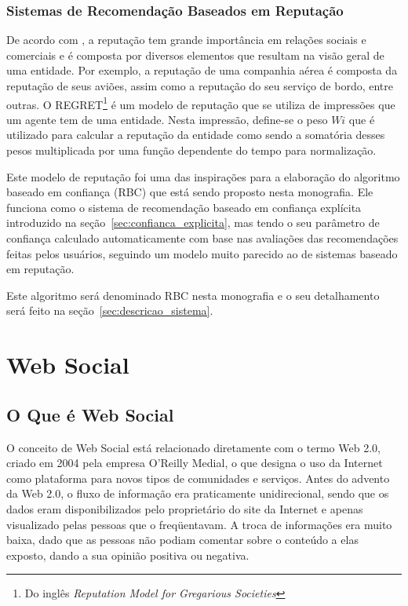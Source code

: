 \subsubsection{Sistemas de Recomendação Baseados em Reputação}
\label{sec:sistemas_de_recomendacao_baseados_em_reputacao}

De acordo com \cite{sabater2001regret}, a reputação tem grande importância em relações sociais e comerciais e é composta por diversos elementos que resultam na visão geral de uma entidade. Por exemplo, a reputação de uma companhia aérea é composta da reputação de seus aviões, assim como a reputação do seu serviço de bordo, entre outras. O REGRET\footnote{Do inglês \textit{Reputation Model for Gregarious Societies}} \cite{sabater2001regret} é um modelo de reputação que se utiliza de impressões que um agente tem de uma entidade. Nesta impressão, define-se o peso $W{i}$ que é utilizado para calcular a reputação da entidade como sendo a somatória desses pesos multiplicada por uma função dependente do tempo para normalização.

Este modelo de reputação foi uma das inspirações para a elaboração do algoritmo baseado em confiança (RBC) que está sendo proposto nesta monografia. Ele funciona como o sistema de recomendação baseado em confiança explícita introduzido na seção~\ref{sec:confianca_explicita}, mas tendo o seu parâmetro de confiança calculado automaticamente com base nas avaliações das recomendações feitas pelos usuários, seguindo um modelo muito parecido ao de sistemas baseado em reputação.

Este algoritmo será denominado RBC nesta monografia e o seu detalhamento será feito na seção~\ref{sec:descricao_sistema}.

\section{Web Social} %

\subsection{O Que é Web Social}

O conceito de Web Social está relacionado diretamente com o termo Web 2.0, criado em 2004 pela empresa O'Reilly Medial, o que designa o uso da Internet como plataforma para novos tipos de comunidades e serviços. Antes do advento da Web 2.0, o fluxo de informação era praticamente unidirecional, sendo que os dados eram disponibilizados pelo proprietário do site da Internet e apenas visualizado pelas pessoas que o freqüentavam. A troca de informações era muito baixa, dado que as pessoas não podiam comentar sobre o conteúdo a elas exposto, dando a sua opinião positiva ou negativa.

